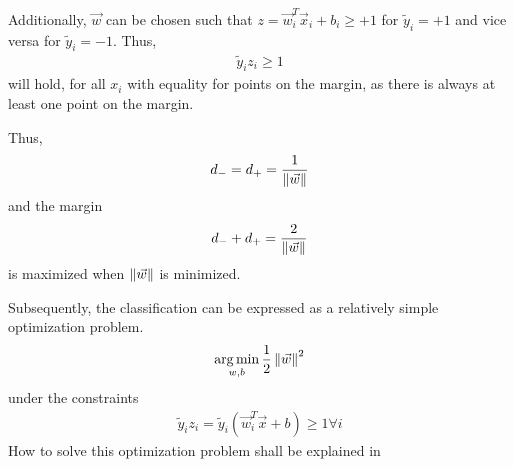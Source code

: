 Additionally, $\vec{w}$ can be chosen such that $z = \vec{w}_i^T \vec{x}_i + b_i \geq +1$ for $\tilde{y}_i = +1$ and vice versa for $\tilde{y}_i = -1$.
Thus,
\begin{align}
    \tilde{y}_i z_i \geq 1
\end{align}
will hold, for all $x_i$ with equality for points on the margin, as there is always at least one point on the margin.

Thus,
\begin{align}
    d_- = d_+ = \frac{1}{\left\lVert\vec{w}\right\rVert}
\end{align}
and the margin
\begin{align}
    d_- + d_+ = \frac{2}{\left\lVert\vec{w}\right\rVert}
\end{align}
is maximized when $\left\lVert\vec{w}\right\rVert$ is minimized.

Subsequently, the classification can be expressed as a relatively simple optimization problem.
\begin{align}
    \operatorname*{arg\,min}_{w, b} \frac{1}{2} \left\lVert\vec{w}\right\rVert^2
\end{align}
under the constraints
\begin{align}
    \tilde{y}_i z_i = \tilde{y}_i (\vec{w}_i^T \vec{x} + b) \geq 1 \forall i
\end{align}
How to solve this optimization problem shall be explained in 














